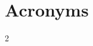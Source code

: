 \chapter{Acronyms}

\footnotesize
\SingleSpacing

\begin{multicols}{2}
\begin{acronym}[AAAAAAAAA] %



\end{acronym}
\end{multicols}
